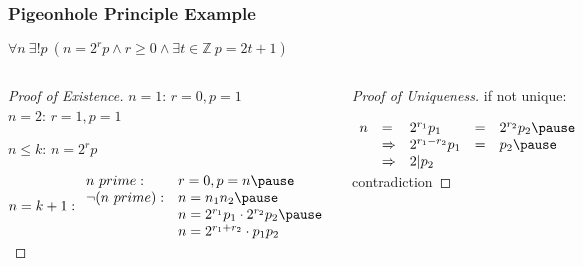 \documentclass[dvipsnames]{beamer}
\begin{document}
\begin{frame}
  \frametitle{Pigeonhole Principle Example}

  \begin{theorem}
    $\forall n~\exists ! p~
      (n = 2^r p \wedge r \geq 0 \wedge \exists t \in \mathbb Z~p = 2t + 1)$\\
  \end{theorem}

  \pause
  \begin{columns}[t]
    \begin{proof}[Proof of Existence]
      $n = 1$: $r = 0, p = 1$\\
      $n = 2$: $r = 1, p = 1$

      \pause
      $n \leq k$: $n = 2^r p$

      \pause
      $n = k + 1:
      \begin{array}{ll}
         n~prime:        & r = 0, p = n\pause\\
         \neg (n~prime): & n = n_1 n_2\pause\\
                        & n = 2^{r_1} p_1 \cdot 2^{r_2} p_2\pause\\
                        & n = 2^{r_1+r_2} \cdot p_1 p_2
      \end{array}$
    \end{proof}

    \pause
    \begin{proof}[Proof of Uniqueness]
      if not unique:

      \pause
      $\begin{array}{lllll}
        n & =           & 2^{r_1} p_1     & = & 2^{r_2} p_2\pause\\
          & \Rightarrow & 2^{r_1-r_2} p_1 & = & p_2\pause\\
          & \Rightarrow & 2 | p_2
      \end{array}$
      \alert{contradiction}
    \end{proof}
  \end{columns}
\end{frame}
\end{document}
